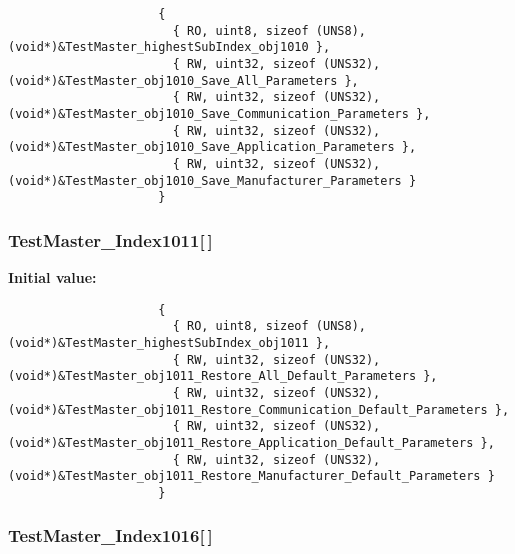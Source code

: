 \begin{Code}\begin{verbatim} 
                     {
                       { RO, uint8, sizeof (UNS8), (void*)&TestMaster_highestSubIndex_obj1010 },
                       { RW, uint32, sizeof (UNS32), (void*)&TestMaster_obj1010_Save_All_Parameters },
                       { RW, uint32, sizeof (UNS32), (void*)&TestMaster_obj1010_Save_Communication_Parameters },
                       { RW, uint32, sizeof (UNS32), (void*)&TestMaster_obj1010_Save_Application_Parameters },
                       { RW, uint32, sizeof (UNS32), (void*)&TestMaster_obj1010_Save_Manufacturer_Parameters }
                     }
\end{verbatim}\end{Code}
\subsubsection{ {\bf Test\-Master\_\-Index1011}[$\,$]}\label{TestMasterSlave_2TestMaster_8c_c288f1b360d84c194709cc87ab7750fe}


\textbf{Initial value:}

\begin{Code}\begin{verbatim} 
                     {
                       { RO, uint8, sizeof (UNS8), (void*)&TestMaster_highestSubIndex_obj1011 },
                       { RW, uint32, sizeof (UNS32), (void*)&TestMaster_obj1011_Restore_All_Default_Parameters },
                       { RW, uint32, sizeof (UNS32), (void*)&TestMaster_obj1011_Restore_Communication_Default_Parameters },
                       { RW, uint32, sizeof (UNS32), (void*)&TestMaster_obj1011_Restore_Application_Default_Parameters },
                       { RW, uint32, sizeof (UNS32), (void*)&TestMaster_obj1011_Restore_Manufacturer_Default_Parameters }
                     }
\end{verbatim}\end{Code}
\subsubsection{ {\bf Test\-Master\_\-Index1016}[$\,$]}\label{TestMasterSlave_2TestMaster_8c_24052245a9506091a0a4d2f019a971cd}


